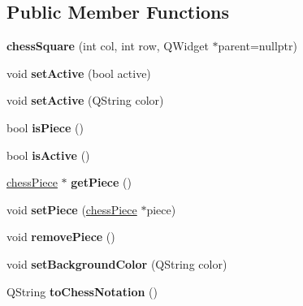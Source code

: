 \subsection*{Public Member Functions}
\begin{DoxyCompactItemize}
\item 
\mbox{\label{classchessSquare_a818660e4b5fc11c1749a9af5b9a35aff}} 
{\bfseries chess\+Square} (int col, int row, Q\+Widget $\ast$parent=nullptr)
\item 
\mbox{\label{classchessSquare_a2393c2aee673f38f121a82562707c740}} 
void {\bfseries set\+Active} (bool active)
\item 
\mbox{\label{classchessSquare_a36cdc0a51aa436eb4fe0ee70cfc80bc9}} 
void {\bfseries set\+Active} (Q\+String color)
\item 
\mbox{\label{classchessSquare_ac8ae6f86143d988ab3c9d54c89c2784f}} 
bool {\bfseries is\+Piece} ()
\item 
\mbox{\label{classchessSquare_ad099713945d1e0a01514cf8b939a34b1}} 
bool {\bfseries is\+Active} ()
\item 
\mbox{\label{classchessSquare_a2fee406370161f95d9a4ff9b0e82c436}} 
\hyperlink{classchessPiece}{chess\+Piece} $\ast$ {\bfseries get\+Piece} ()
\item 
\mbox{\label{classchessSquare_aa7cbc607deb4a7e4844553e3c74076a1}} 
void {\bfseries set\+Piece} (\hyperlink{classchessPiece}{chess\+Piece} $\ast$piece)
\item 
\mbox{\label{classchessSquare_ace9bb5543d5e8a2354a979bd7dc95c5c}} 
void {\bfseries remove\+Piece} ()
\item 
\mbox{\label{classchessSquare_a2834d87001da98346f34e72168b70ea7}} 
void {\bfseries set\+Background\+Color} (Q\+String color)
\item 
\mbox{\label{classchessSquare_a370b3b5cffd0d7fa91ac23f107e062e5}} 
Q\+String {\bfseries to\+Chess\+Notation} ()
\end{DoxyCompactItemize}

